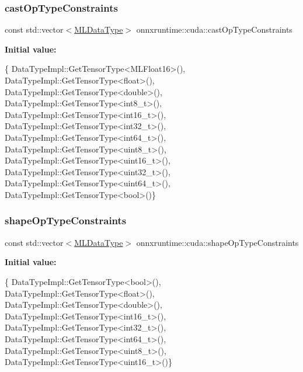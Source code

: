 \subsubsection{\texorpdfstring{cast\+Op\+Type\+Constraints}{castOpTypeConstraints}}
{\footnotesize\ttfamily const std\+::vector$<$\mbox{\hyperlink{namespaceonnxruntime_ad77d0a6e838ec7da5dc35fed5ee66b49}{M\+L\+Data\+Type}}$>$ onnxruntime\+::cuda\+::cast\+Op\+Type\+Constraints}

{\bfseries Initial value\+:}
\begin{DoxyCode}
\{
    DataTypeImpl::GetTensorType<MLFloat16>(),
    DataTypeImpl::GetTensorType<float>(),
    DataTypeImpl::GetTensorType<double>(),
    DataTypeImpl::GetTensorType<int8\_t>(),
    DataTypeImpl::GetTensorType<int16\_t>(),
    DataTypeImpl::GetTensorType<int32\_t>(),
    DataTypeImpl::GetTensorType<int64\_t>(),
    DataTypeImpl::GetTensorType<uint8\_t>(),
    DataTypeImpl::GetTensorType<uint16\_t>(),
    DataTypeImpl::GetTensorType<uint32\_t>(),
    DataTypeImpl::GetTensorType<uint64\_t>(),
    DataTypeImpl::GetTensorType<bool>()\}
\end{DoxyCode}
\mbox{\label{namespaceonnxruntime_1_1cuda_aa2fb1530bbf277f6572e0c2865818fad}} 
\subsubsection{\texorpdfstring{shape\+Op\+Type\+Constraints}{shapeOpTypeConstraints}}
{\footnotesize\ttfamily const std\+::vector$<$\mbox{\hyperlink{namespaceonnxruntime_ad77d0a6e838ec7da5dc35fed5ee66b49}{M\+L\+Data\+Type}}$>$ onnxruntime\+::cuda\+::shape\+Op\+Type\+Constraints}

{\bfseries Initial value\+:}
\begin{DoxyCode}
\{
    DataTypeImpl::GetTensorType<bool>(),
    DataTypeImpl::GetTensorType<float>(),
    DataTypeImpl::GetTensorType<double>(),
    DataTypeImpl::GetTensorType<int16\_t>(),
    DataTypeImpl::GetTensorType<int32\_t>(),
    DataTypeImpl::GetTensorType<int64\_t>(),
    DataTypeImpl::GetTensorType<uint8\_t>(),
    DataTypeImpl::GetTensorType<uint16\_t>()\}
\end{DoxyCode}
